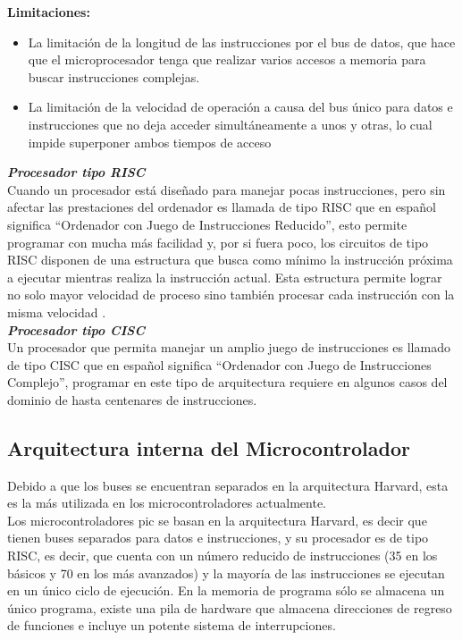 \documentclass[12pt,a4paper]{article}
\begin{document}
   \textbf{Limitaciones:}
   \begin{itemize}
   		\item La limitación de la longitud de las instrucciones por el bus de datos, que hace que el microprocesador tenga que realizar varios accesos a memoria para buscar instrucciones complejas.
   		\item La limitación de la velocidad de operación a causa del bus único para datos e instrucciones que no deja acceder simultáneamente a unos y otras, lo cual impide superponer ambos tiempos de acceso
\end{itemize}      
   
   \textbf{\textit{Procesador tipo RISC}}\\
   Cuando un procesador está diseñado para manejar pocas instrucciones, pero sin afectar las prestaciones del ordenador es llamada de tipo RISC que en español significa “Ordenador con Juego de Instrucciones Reducido”, esto permite programar con mucha más facilidad y, por si fuera poco, los circuitos de tipo RISC disponen de una estructura que busca como mínimo la instrucción próxima a ejecutar mientras realiza la instrucción actual. Esta estructura permite lograr no solo mayor velocidad de proceso sino también procesar cada instrucción con la misma velocidad \cite{Furber}.\\
   
   \textbf{\textit{Procesador tipo CISC}}\\
   Un procesador que permita manejar un amplio juego de instrucciones es llamado de tipo CISC que en español significa “Ordenador con Juego de Instrucciones Complejo”, programar en este tipo de arquitectura requiere en algunos casos del dominio de hasta centenares de instrucciones\cite{Jain}.
   
   \subsection{Arquitectura interna del Microcontrolador}
   Debido a que los buses se encuentran separados en la arquitectura Harvard, esta es la más utilizada en los microcontroladores actualmente.\\
   Los microcontroladores pic se basan en la arquitectura Harvard, es decir que tienen buses separados para datos e instrucciones, y su procesador es de tipo RISC, es decir, que cuenta con un número reducido de instrucciones (35 en los básicos y 70 en los más avanzados) y la mayoría de las instrucciones se ejecutan en un único ciclo de ejecución. En la memoria de programa sólo se almacena un único programa, existe una pila de hardware que almacena direcciones de regreso de funciones e incluye un potente sistema de interrupciones.
   
\end{document}
